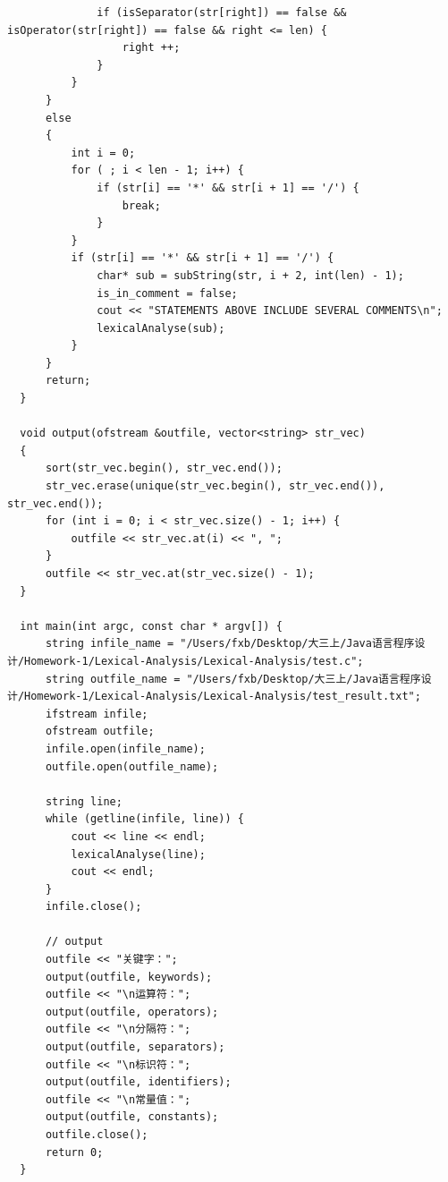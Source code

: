 \documentclass[11pt]{homework}
\begin{document}
\begin{lstlisting}
              if (isSeparator(str[right]) == false && isOperator(str[right]) == false && right <= len) {
                  right ++;
              }
          }
      }
      else
      {
          int i = 0;
          for ( ; i < len - 1; i++) {
              if (str[i] == '*' && str[i + 1] == '/') {
                  break;
              }
          }
          if (str[i] == '*' && str[i + 1] == '/') {
              char* sub = subString(str, i + 2, int(len) - 1);
              is_in_comment = false;
              cout << "STATEMENTS ABOVE INCLUDE SEVERAL COMMENTS\n";
              lexicalAnalyse(sub);
          }
      }
      return;
  }
  
  void output(ofstream &outfile, vector<string> str_vec)
  {
      sort(str_vec.begin(), str_vec.end());
      str_vec.erase(unique(str_vec.begin(), str_vec.end()), str_vec.end());
      for (int i = 0; i < str_vec.size() - 1; i++) {
          outfile << str_vec.at(i) << ", ";
      }
      outfile << str_vec.at(str_vec.size() - 1);
  }
  
  int main(int argc, const char * argv[]) {
      string infile_name = "/Users/fxb/Desktop/大三上/Java语言程序设计/Homework-1/Lexical-Analysis/Lexical-Analysis/test.c";
      string outfile_name = "/Users/fxb/Desktop/大三上/Java语言程序设计/Homework-1/Lexical-Analysis/Lexical-Analysis/test_result.txt";
      ifstream infile;
      ofstream outfile;
      infile.open(infile_name);
      outfile.open(outfile_name);
      
      string line;
      while (getline(infile, line)) {
          cout << line << endl;
          lexicalAnalyse(line);
          cout << endl;
      }
      infile.close();
      
      // output
      outfile << "关键字：";
      output(outfile, keywords);
      outfile << "\n运算符：";
      output(outfile, operators);
      outfile << "\n分隔符：";
      output(outfile, separators);
      outfile << "\n标识符：";
      output(outfile, identifiers);
      outfile << "\n常量值：";
      output(outfile, constants);
      outfile.close();
      return 0;
  }  
\end{lstlisting}
\end{document}
